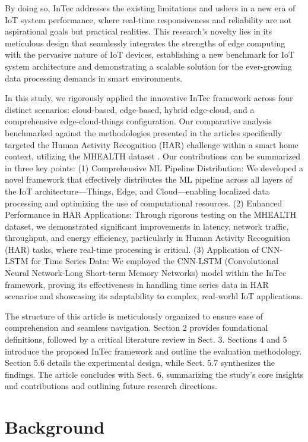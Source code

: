 \documentclass[11pt]{article}
\begin{document}
	By doing so, InTec addresses the existing limitations and ushers in a new era
	of IoT system performance, where real-time responsiveness and reliability are not
	aspirational goals but practical realities. This research’s novelty lies in its meticulous
	design that seamlessly integrates the strengths of edge computing with the pervasive
	nature of IoT devices, establishing a new benchmark for IoT system architecture and
	demonstrating a scalable solution for the ever-growing data processing demands in
	smart environments.
	
	In this study, we rigorously applied the innovative InTec framework across four
	distinct scenarios: cloud-based, edge-based, hybrid edge-cloud, and a comprehensive edge-cloud-things configuration. Our comparative analysis benchmarked
	against the methodologies presented in the articles \cite{c15, c16, c17} specifically targeted the
	Human Activity Recognition (HAR) challenge within a smart home context, utilizing the MHEALTH dataset \cite{c18}. Our contributions can be summarized in three
	key points: (1) Comprehensive ML Pipeline Distribution: We developed a novel
	framework that effectively distributes the ML pipeline across all layers of the IoT
	architecture—Things, Edge, and Cloud—enabling localized data processing and
	optimizing the use of computational resources. (2) Enhanced Performance in HAR Applications: Through rigorous testing on the MHEALTH dataset, we demonstrated
	significant improvements in latency, network traffic, throughput, and energy efficiency, particularly in Human Activity Recognition (HAR) tasks, where real-time
	processing is critical. (3) Application of CNN-LSTM for Time Series Data: We
	employed the CNN-LSTM (Convolutional Neural Network-Long Short-term Memory Networks) model within the InTec framework, proving its effectiveness in handling time series data in HAR scenarios and showcasing its adaptability to complex,
	real-world IoT applications.
	
	The structure of this article is meticulously organized to ensure ease of comprehension and seamless navigation. Section 2 provides foundational definitions, followed by a critical literature review in Sect. 3. Sections 4 and 5 introduce the proposed InTec framework and outline the evaluation methodology. Section 5.6 details
	the experimental design, while Sect. 5.7 synthesizes the findings. The article concludes with Sect. 6, summarizing the study’s core insights and contributions and
	outlining future research directions.
	
	\section{Background}
	\label{Background}
\end{document}
